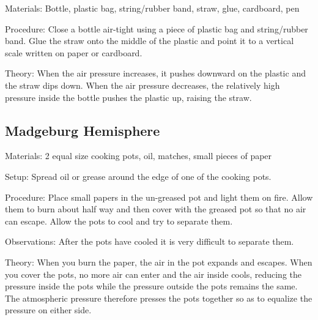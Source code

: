 \begin{multicols}{2}
\begin{description*}
\item[Materials:]{Bottle, plastic bag, string/rubber band, straw, glue, cardboard, pen}
\item[Procedure:]{Close a bottle air-tight using a piece of plastic bag and string/rubber band. Glue the straw onto the middle of the plastic and point it to a vertical scale written on paper or cardboard.}
\item[Theory:]{When the air pressure increases, it pushes downward on the plastic and the straw dips down. When the air pressure decreases, the relatively high pressure inside the bottle pushes the plastic up, raising the straw.}
\end{description*}

\subsection{Madgeburg Hemisphere}


\begin{description*}
\item[Materials:]{2 equal size cooking pots, oil, matches, small pieces of paper}
\item[Setup:]{Spread oil or grease around the edge of one of the cooking pots.}
\item[Procedure:]{Place small papers in the un-greased pot and light them on fire. Allow them to burn about half way and then cover with the greased pot so that no air can escape. Allow the pots to cool and try to separate them.}
\item[Observations:]{After the pots have cooled it is very difficult to separate them.}
\item[Theory:]{When you burn the paper, the air in the pot expands and escapes. When you cover the pots, no more air can enter and the air inside cools, reducing the pressure inside the pots while the pressure outside the pots remains the same. The atmospheric pressure therefore presses the pots together so as to equalize the pressure on either side. }
\end{description*}


\end{multicols}
